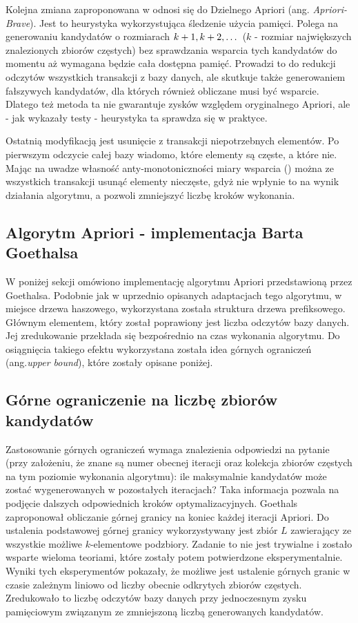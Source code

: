 Kolejna zmiana zaproponowana w \cite{Bodon} odnosi się do Dzielnego Apriori (ang. \textit{Apriori-Brave}). Jest to heurystyka wykorzystująca śledzenie użycia pamięci. Polega na generowaniu kandydatów o rozmiarach \(k\nolinebreak+\nolinebreak 1, k\nolinebreak+\nolinebreak 2, \dots\) (\(k\) - rozmiar największych znalezionych zbiorów częstych) bez sprawdzania wsparcia tych kandydatów do momentu aż wymagana będzie cała dostępna pamięć. Prowadzi to do redukcji odczytów wszystkich transakcji z bazy danych, ale skutkuje także generowaniem fałszywych kandydatów, dla których również obliczane musi być wsparcie. Dlatego też metoda ta nie gwarantuje zysków względem oryginalnego Apriori, ale - jak wykazały testy - heurystyka ta sprawdza się w praktyce.

Ostatnią modyfikacją jest usunięcie z transakcji niepotrzebnych elementów. Po pierwszym odczycie całej bazy wiadomo, które elementy są częste, a które nie. Mając na uwadze własność anty-monotoniczności miary wsparcia (\cite{Morzy}) można ze wszystkich transakcji usunąć elementy nieczęste, gdyż nie wpłynie to na wynik działania algorytmu, a pozwoli zmniejszyć liczbę kroków wykonania. 

\subsection{Algorytm Apriori - implementacja Barta Goethalsa \cite{Goethals}}
\label{c324}
W poniżej sekcji omówiono implementację algorytmu Apriori przedstawioną przez Goethalsa. Podobnie jak w uprzednio opisanych adaptacjach tego algorytmu,  w miejsce drzewa haszowego, wykorzystana została struktura drzewa prefiksowego. Głównym elementem, który został poprawiony jest liczba odczytów bazy danych. Jej zredukowanie przekłada się bezpośrednio na czas wykonania algorytmu. Do osiągnięcia takiego efektu wykorzystana została idea górnych ograniczeń (ang.\textit{upper bound}), które zostały opisane poniżej.

\subsection*{Górne ograniczenie na liczbę zbiorów kandydatów}
Zastosowanie górnych ograniczeń wymaga znalezienia odpowiedzi na pytanie (przy założeniu, że znane są numer obecnej iteracji oraz kolekcja zbiorów częstych na tym poziomie wykonania algorytmu): ile maksymalnie kandydatów może zostać wygenerowanych w pozostałych iteracjach? Taka informacja pozwala na podjęcie dalszych odpowiednich kroków optymalizacyjnych. Goethals \cite{Goethals} zaproponował obliczanie górnej granicy na koniec każdej iteracji Apriori. Do ustalenia podstawowej górnej granicy wykorzystywany jest zbiór \(L\) zawierający ze wszystkie możliwe \(k\)-elementowe podzbiory. Zadanie to nie jest trywialne i zostało wsparte wieloma teoriami, które zostały potem potwierdzone eksperymentalnie. Wyniki tych eksperymentów pokazały, że możliwe jest ustalenie górnych granic w czasie zależnym liniowo od liczby obecnie odkrytych zbiorów częstych. Zredukowało to liczbę odczytów bazy danych przy jednoczesnym zysku pamięciowym związanym ze zmniejszoną liczbą generowanych kandydatów. 


